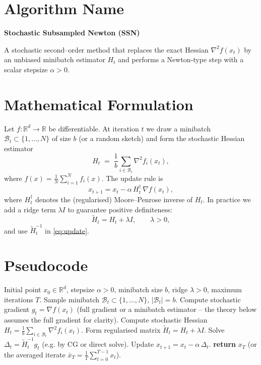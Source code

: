 \documentclass{article}
\newcommand{\R}{\mathbb{R}}
\begin{document}
\section*{Algorithm Name}
\textbf{Stochastic Subsampled Newton (SSN)}  

A stochastic second–order method that replaces the exact Hessian $\nabla^{2}f(x_{t})$ by an unbiased minibatch estimator $H_{t}$ and performs a Newton‐type step with a scalar stepsize $\alpha>0$.

\section*{Mathematical Formulation}
Let $f:\R^{d}\rightarrow\R$ be differentiable. At iteration $t$ we draw a minibatch $\mathcal{B}_{t}\subset\{1,\dots,N\}$ of size $b$ (or a random sketch) and form the stochastic Hessian estimator
\[
H_{t}\;=\;\frac{1}{b}\sum_{i\in\mathcal{B}_{t}}\nabla^{2}f_{i}(x_{t}),
\]
where $f(x)=\frac{1}{N}\sum_{i=1}^{N}f_{i}(x)$.  
The update rule is
\begin{equation}\label{eq:update}
x_{t+1}=x_{t}-\alpha\, H_{t}^{\dagger}\,\nabla f(x_{t}),
\end{equation}
where $H_{t}^{\dagger}$ denotes the (regularised) Moore–Penrose inverse of $H_{t}$. In practice we add a ridge term $\lambda I$ to guarantee positive definiteness:
\[
\tilde H_{t}=H_{t}+\lambda I,\qquad \lambda>0,
\]
and use $\tilde H_{t}^{-1}$ in \eqref{eq:update}.

\section*{Pseudocode}
\begin{algorithm}[H]
\caption{Stochastic Subsampled Newton (SSN)}\label{alg:ssn}
\begin{algorithmic}[1]
\Require Initial point $x_{0}\in\R^{d}$, stepsize $\alpha>0$, minibatch size $b$, ridge $\lambda>0$, maximum iterations $T$.
    \State Sample minibatch $\mathcal{B}_{t}\subset\{1,\dots,N\}$, $|\mathcal{B}_{t}|=b$.
    \State Compute stochastic gradient $g_{t}= \nabla f(x_{t})$ (full gradient or a minibatch estimator – the theory below assumes the full gradient for clarity).
    \State Compute stochastic Hessian $H_{t}= \frac{1}{b}\sum_{i\in\mathcal{B}_{t}}\nabla^{2}f_{i}(x_{t})$.
    \State Form regularised matrix $\tilde H_{t}=H_{t}+\lambda I$.
    \State Solve $\Delta_{t}= \tilde H_{t}^{-1} g_{t}$ (e.g. by CG or direct solve).
    \State Update $x_{t+1}= x_{t}-\alpha\,\Delta_{t}$.
\EndFor
\State \textbf{return} $x_{T}$ (or the averaged iterate $\bar x_{T}= \frac{1}{T}\sum_{t=0}^{T-1}x_{t}$).
\end{algorithmic}
\end{algorithm}
\end{document}
